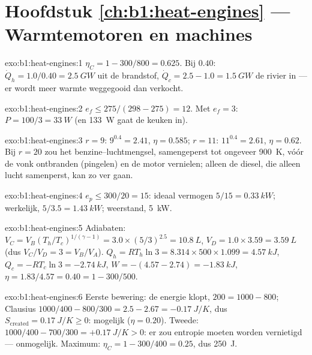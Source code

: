\section*{Hoofdstuk \ref{ch:b1:heat-engines} --- Warmtemotoren en machines}

\begin{solution}{exo:b1:heat-engines:1}
$\eta_C = 1 - 300/800 = 0.625$. Bij $0.40$: $\dot Q_h = 1.0/0.40 = \qty{2.5}{GW}$
uit de brandstof, $\dot Q_c = 2.5 - 1.0 = \qty{1.5}{GW}$ de rivier in --- er wordt meer
warmte weggegooid dan verkocht.
\end{solution}

\begin{solution}{exo:b1:heat-engines:2}
$e_f \leq 275/(298 - 275) = 12$. Met $e_f = 3$: $P = 100/3 = \qty{33}{W}$
(en \qty{133}{W} gaat de keuken in).
\end{solution}

\begin{solution}{exo:b1:heat-engines:3}
$r = 9$: $9^{0.4} = 2.41$, $\eta = 0.585$; $r = 11$: $11^{0.4} = 2.61$,
$\eta = 0.62$. Bij $r = 20$ zou het benzine--luchtmengsel, samengeperst tot ongeveer
\qty{900}{K}, vóór de vonk ontbranden (pingelen) en de motor
vernielen; alleen de diesel, die alleen lucht samenperst, kan zo ver gaan.
\end{solution}

\begin{solution}{exo:b1:heat-engines:4}
$e_p \leq 300/20 = 15$: ideaal vermogen $5/15 = \qty{0.33}{kW}$; werkelijk, $5/3.5 =
\qty{1.43}{kW}$; weerstand, \qty{5}{kW}.
\end{solution}

\begin{solution}{exo:b1:heat-engines:5}
Adiabaten: $V_C = V_B(T_h/T_c)^{1/(\gamma-1)} = 3.0 \times (5/3)^{2.5} =
\qty{10.8}{L}$, $V_D = 1.0 \times 3.59 = \qty{3.59}{L}$ (dus $V_C/V_D = 3 =
V_B/V_A$). $Q_h = RT_h\ln3 = 8.314 \times 500 \times 1.099 = \qty{4.57}{kJ}$,
$Q_c = -RT_c\ln3 = \qty{-2.74}{kJ}$, $W = -(4.57 - 2.74) = \qty{-1.83}{kJ}$,
$\eta = 1.83/4.57 = 0.40 = 1 - 300/500$.
\end{solution}

\begin{solution}{exo:b1:heat-engines:6}
Eerste bewering: de energie klopt, $200 = 1000 - 800$; Clausius $1000/400 - 800/300
= 2.5 - 2.67 = \qty{-0.17}{J/K}$, dus $S_{\mathrm{created}} = \qty{0.17}{J/K} \geq 0$:
mogelijk ($\eta = 0.20$). Tweede: $1000/400 - 700/300 = +\qty{0.17}{J/K} > 0$:
er zou entropie moeten worden vernietigd --- onmogelijk. Maximum: $\eta_C = 1 -
300/400 = 0.25$, dus \qty{250}{J}.
\end{solution}

